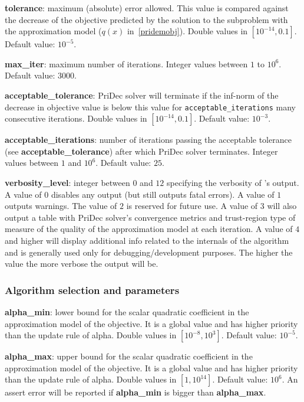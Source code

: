  \noindent \textbf{tolerance}: maximum (absolute) error allowed. This value is compared against the decrease of the objective predicted by the solution to the subproblem with the approximation model ($q(x)$ in~\eqref{pridemobj}). Double values in $[10^{-14},0.1]$. Default value: $10^{-5}$.

  \medskip

  \noindent \textbf{max\_iter}: maximum number of iterations. Integer values between $1$ to $10^6$. Default value: $3000$.
  \medskip
  
  \noindent \textbf{acceptable\_tolerance}: PriDec solver will terminate if the inf-norm of the decrease in objective value is below this value for \texttt{acceptable\_iterations} many consecutive iterations. Double values in $[10^{-14},0.1]$. Default value: $10^{-3}$.

  \medskip

  \noindent \textbf{acceptable\_iterations}: number of iterations passing the acceptable tolerance (see \textbf{acceptable\_tolerance}) after which PriDec solver terminates. Integer values between $1$ and $10^6$. Default value: $25$.

  \medskip

 \noindent \textbf{verbosity\_level}: integer between $0$ and $12$ specifying the verbosity of \Hi's output. A value of $0$ disables any output (but still outputs fatal errors). A value of $1$ outputs warnings. The value of $2$ is reserved for future use. A value of $3$ will also output a table with PriDec solver's convergence metrics and trust-region type of measure of the quality of the approximation model at each iteration. A value of $4$ and higher will display additional info related to the internals of the algorithm and is generally used only for debugging/development purposes. The higher the value the more verbose the output will be.


\subsubsection{Algorithm selection and parameters}
  \noindent \textbf{alpha\_min}: lower bound for the scalar quadratic coefficient in the approximation model of the objective. It is a global value and has higher priority than the update rule of alpha. Double values in $[10^{-8},10^3]$. Default value: $10^{-5}$.

  \medskip

  \noindent \textbf{alpha\_max}: upper bound for the scalar quadratic coefficient in the approximation model of the objective. It is a global value and has higher priority than the update rule of alpha. Double values in $[1,10^{14}]$. Default value: $10^6$. An assert error will be reported if \textbf{alpha\_min} is bigger than \textbf{alpha\_max}.
%

